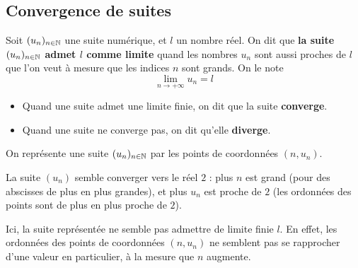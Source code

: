 \documentclass{poly}
\begin{document}
\subsection{Convergence de suites}
\begin{definition}
Soit $(u_n)_{n \in \mathbb{N}}$ une suite numérique, et $l$ un nombre réel. On dit que \textbf{la suite $(u_n)_{n \in \mathbb{N}}$ admet $l$ comme limite} quand les nombres $u_n$ sont aussi proches de $l$ que l'on veut à mesure que les indices $n$ sont grands. On le note
\begin{equation*}
\lim_{n \to +\infty} u_n = l 
\end{equation*}
\end{definition}
\begin{remark}
\hfill
\begin{itemize}
\item Quand une suite admet une limite finie, on dit que la suite \textbf{converge}.
\item Quand une suite ne converge pas, on dit qu'elle \textbf{diverge}.
\end{itemize}
\end{remark}
\begin{example}
On représente une suite $(u_n)_{n \in \mathbb{N}}$ par les points de coordonnées $(n,u_n)$. 
\begin{center}
\end{center}
\begin{tcolorbox}
La suite $(u_n)$ semble converger vers le réel $2$ : plus $n$ est grand (pour des abscisses de plus en plus grandes), et plus $u_n$ est proche de $2$ (les ordonnées des points sont de plus en plus proche de $2$).
\end{tcolorbox}
\begin{center}
\end{center}
\begin{tcolorbox}
Ici, la suite représentée ne semble pas admettre de limite finie $l$. En effet, les ordonnées des points de coordonnées $(n,u_n)$ ne semblent pas se rapprocher d'une valeur en particulier, à la mesure que $n$ augmente.
\end{tcolorbox}
\end{example}
\newpage
\end{document}

